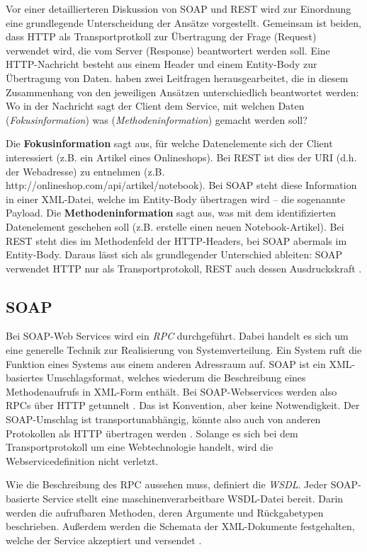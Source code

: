 \documentclass[11pt, a4paper, titlepage, listof=totoc, bibliography=totoc, index=totoc, twoside, openright, headings=normal]{scrreprt}
\begin{document}
Vor einer detaillierteren Diskussion von SOAP und REST wird zur Einordnung eine grundlegende Unterscheidung der Ansätze vorgestellt. Gemeinsam ist beiden, dass HTTP als Transportprotkoll zur Übertragung der Frage (Request) verwendet wird, die vom Server (Response) beantwortert werden soll. Eine HTTP-Nachricht besteht aus einem Header und einem Entity-Body zur Übertragung von Daten. \citet{richardson07} haben zwei Leitfragen herausgearbeitet, die in diesem Zusammenhang von den jeweiligen Ansätzen unterschiedlich beantwortet werden: Wo in der Nachricht sagt der Client dem Service, mit welchen Daten (\emph{Fokusinformation}) was (\emph{Methodeninformation}) gemacht werden soll?

Die \textbf{Fokusinformation} sagt aus, für welche Datenelemente sich der Client interessiert (z.B. ein Artikel eines Onlineshops). Bei REST ist dies der \ac{URI} (d.h. der Webadresse) zu entnehmen (z.B. http://onlineshop.com/api/artikel/notebook). Bei SOAP steht diese Information in einer XML-Datei, welche im Entity-Body übertragen wird -- die sogenannte Payload. Die \textbf{Methodeninformation} sagt aus, was mit dem identifizierten Datenelement geschehen soll (z.B. \glqq erstelle einen neuen Notebook-Artikel\grqq{}). Bei REST steht dies im Methodenfeld der HTTP-Headers, bei SOAP abermals im Entity-Body. Daraus lässt sich als grundlegender Unterschied ableiten: SOAP verwendet HTTP nur als Transportprotokoll, REST auch dessen Ausdruckskraft \citep{wilde11}.

\subsection{SOAP}
Bei SOAP-Web Services wird ein \emph{\ac{RPC}} durchgeführt. Dabei handelt es sich um eine generelle Technik zur Realisierung von Systemverteilung. Ein System ruft die Funktion eines Systems aus einem anderen Adressraum auf. SOAP ist ein XML-basiertes Umschlagsformat, welches wiederum die Beschreibung eines Methodenaufrufs in XML-Form enthält. Bei SOAP-Webservices werden also \ac{RPC}s über HTTP getunnelt \citep{wilde11}. Das ist Konvention, aber keine Notwendigkeit. Der SOAP-Umschlag ist transportunabhängig, könnte also auch von anderen Protokollen als HTTP übertragen werden \citep{tilkov11}. Solange es sich bei dem Transportprotokoll um eine Webtechnologie handelt, wird die Webservicedefinition nicht verletzt.

Wie die Beschreibung des \ac{RPC} aussehen muss, definiert die \emph{\ac{WSDL}}. Jeder SOAP-basierte Service stellt eine maschinenverarbeitbare \ac{WSDL}-Datei bereit. Darin werden die aufrufbaren Methoden, deren Argumente und Rückgabetypen beschrieben. Außerdem werden die Schemata der XML-Dokumente festgehalten, welche der Service akzeptiert und versendet \citep{richardson07}.
\end{document}
